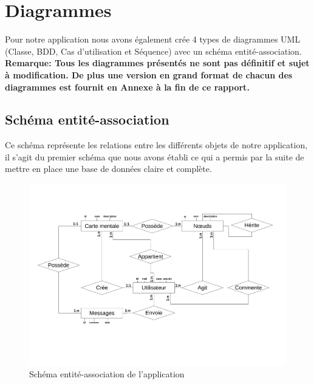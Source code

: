 \documentclass[11pt,a4paper]{article}
\begin{document}
\section{Diagrammes}
Pour notre application nous avons également crée 4 types de diagrammes UML (Classe, BDD, Cas d'utilisation et Séquence) avec un schéma entité-association.\\
\textbf{Remarque: Tous les diagrammes présentés ne sont pas définitif et sujet à modification. De plus une version en grand format de chacun des diagrammes est fournit en Annexe à la fin de ce rapport.}
\subsection{Schéma entité-association}
Ce schéma représente les relations entre les différents objets de notre application, il s'agit du premier schéma que nous avons établi ce qui a permis par la suite de mettre en place une base de données claire et complète.
\begin{figure}[!h]
\includegraphics[scale=0.5]{Image/Schema_entite_association.pdf}
\caption{Schéma entité-association de l'application}
\end{figure}
\end{document}
